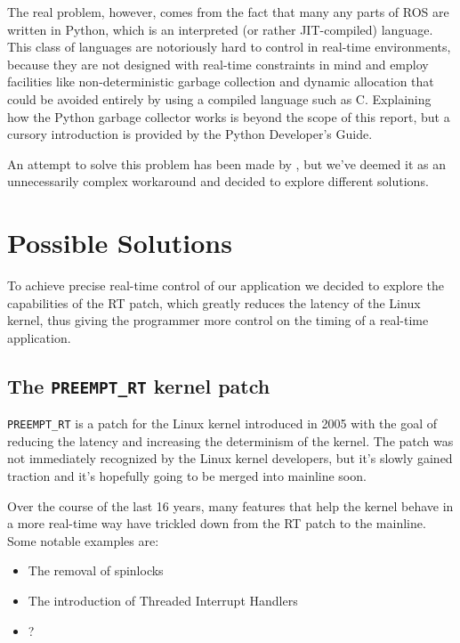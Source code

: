 \documentclass[a4paper,12pt]{report}
\begin{document}
The real problem, however, comes from the fact that many any parts of ROS are written in Python, which is an interpreted (or rather JIT-compiled) language. This class of languages are notoriously hard to control in real-time environments, because they are not designed with real-time constraints in mind and employ facilities like non-deterministic garbage collection and dynamic allocation that could be avoided entirely by using a compiled language such as C. Explaining how the Python garbage collector works is beyond the scope of this report, but a cursory introduction is provided by the Python Developer's Guide\cite{python-devguide-gc}.

An attempt to solve this problem has been made by , but we've deemed it as an unnecessarily complex workaround and decided to explore different solutions.

\section{Possible Solutions}

To achieve precise real-time control of our application we decided to explore the capabilities of the RT patch, which greatly reduces the latency of the Linux kernel, thus giving the programmer more control on the timing of a real-time application.

\subsection{The \texttt{PREEMPT\_RT} kernel patch}

\texttt{PREEMPT\_RT} is a patch for the Linux kernel introduced in 2005 with the goal of reducing the latency and increasing the determinism of the kernel. The patch was not immediately recognized by the Linux kernel developers, but it's slowly gained traction and it's hopefully going to be merged into mainline soon\cite{lwn-rt-future}.

Over the course of the last 16 years, many features that help the kernel behave in a more real-time way have trickled down from the RT patch to the mainline. Some notable examples are:

\begin{itemize}
    \item The removal of spinlocks
    \item The introduction of Threaded Interrupt Handlers
    \item ?
\end{itemize}
\end{document}
